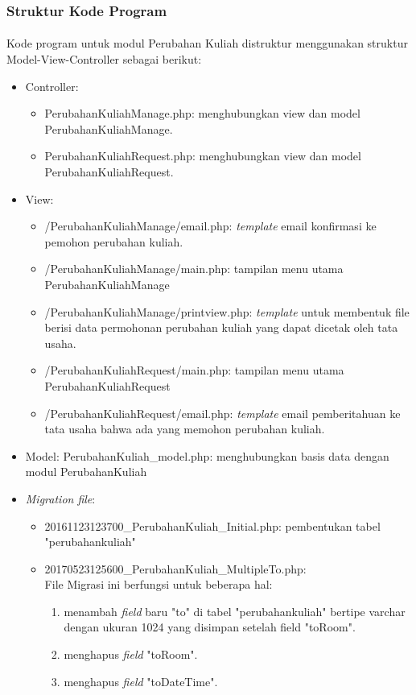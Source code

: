 \subsubsection{Struktur Kode Program}
\paragraph{}Kode program untuk modul Perubahan Kuliah distruktur menggunakan struktur Model-View-Controller sebagai berikut:
\begin{itemize}
	\item Controller:
		\begin{itemize}
			\item PerubahanKuliahManage.php: menghubungkan view dan model PerubahanKuliahManage.
			\item PerubahanKuliahRequest.php: menghubungkan view dan model PerubahanKuliahRequest.
		\end{itemize}
	\item View:
		\begin{itemize}
			\item /PerubahanKuliahManage/email.php: \textit{template} email konfirmasi ke pemohon perubahan kuliah.
			\item /PerubahanKuliahManage/main.php: tampilan menu utama PerubahanKuliahManage
			\item /PerubahanKuliahManage/printview.php: \textit{template} untuk membentuk file berisi data permohonan perubahan kuliah yang dapat dicetak oleh tata usaha.
			\item /PerubahanKuliahRequest/main.php: tampilan menu utama PerubahanKuliahRequest
			\item /PerubahanKuliahRequest/email.php: \textit{template} email pemberitahuan ke tata usaha bahwa ada yang memohon perubahan kuliah.
		\end{itemize}
	\item Model: PerubahanKuliah\_model.php: menghubungkan basis data dengan modul PerubahanKuliah
	\item \textit{Migration file}:
		\begin{itemize}
			\item 20161123123700\_PerubahanKuliah\_Initial.php: pembentukan tabel "perubahankuliah"
			\item 20170523125600\_PerubahanKuliah\_MultipleTo.php: \\
			File Migrasi ini berfungsi untuk beberapa hal:
				\begin{enumerate}
					\item menambah \textit{field} baru "to" di tabel "perubahankuliah" bertipe varchar dengan ukuran 1024 yang disimpan setelah field "toRoom".
					\item menghapus \textit{field} "toRoom".
					\item menghapus \textit{field} "toDateTime".
				\end{enumerate}
		\end{itemize}
\end{itemize}

